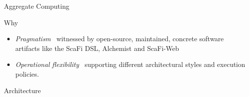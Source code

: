 \documentclass[presentation, 9pt]{beamer}\mode<presentation>{\usetheme{AMSBolognaFC}}
\begin{document}
\begin{frame}[allowframebreaks]{Aggregate Computing}
\begin{block}{Why}
\begin{itemize}
	\item \emph{Pragmatism} \faArrowRight \, witnessed by open-source, maintained, concrete software artifacts like the ScaFi DSL, Alchemist and {\sc{}ScaFi-Web}
	\item \emph{Operational flexibility} \faArrowRight \, supporting different architectural styles and execution policies.
\end{itemize}
\end{block}
\end{frame}

\begin{frame}{Architecture}
\centering
{}
\end{frame}

\section*{}

\frame{\titlepage}

\section*{\refname}

\begin{frame}{\refname}
	\tiny
	\printbibliography
\end{frame}

\end{document}
